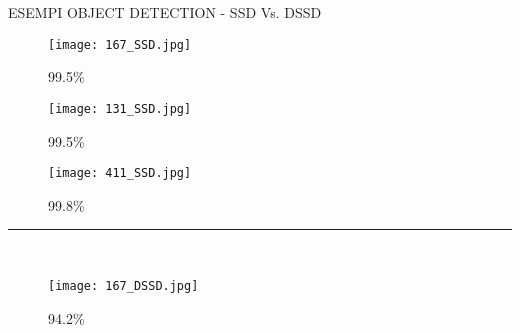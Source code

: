 \begin{frame}{ESEMPI OBJECT DETECTION - SSD Vs. DSSD}
    \begin{minipage}{\linewidth}
        \vspace{0.3cm}
        \begin{minipage}{0.32\linewidth}
            \begin{figure}
                \centering
                \vspace{-0.04cm}
                \texttt{[image: 167\_SSD.jpg]}
                \caption{99.5\%}
            \end{figure}
        \end{minipage}
        \hspace{0.35cm}
        \begin{minipage}{0.32\linewidth}
            \begin{figure}
                \centering
                \texttt{[image: 131\_SSD.jpg]}
                \caption{99.5\%}
            \end{figure}
        \end{minipage}
        \hspace{-0.50cm}
        \begin{minipage}{0.32\linewidth}
            \begin{figure}
                \centering
                \texttt{[image: 411\_SSD.jpg]}  
                \caption{99.8\%}
            \end{figure}
        \end{minipage}
    \end{minipage}  
    \dotfill
    {\hspace*{-0.3cm}\rule{\textwidth}{1pt}}\\
    \vspace{0.3cm}
    \centering{\bfseries{\color{OliveGreen}{\Large DSSD}}}  
    \begin{minipage}{\linewidth}
        \vspace{0.3cm}
        \begin{minipage}{0.32\linewidth}
            \begin{figure}
                \centering
                \vspace{-0.04cm}
                \texttt{[image: 167\_DSSD.jpg]}
                \caption{94.2\%}
            \end{figure}
        \end{minipage}

\end{minipage}
\end{frame}
